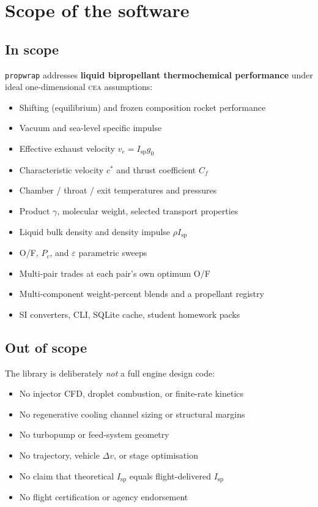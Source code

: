 \documentclass[11pt,a4paper]{report}
\newcommand{\pw}{\texttt{propwrap}}
\newcommand{\cea}{\textsc{cea}}
\newcommand{\Isp}{I_{\mathrm{sp}}}
\newcommand{\cstar}{c^{*}}
\newcommand{\Cf}{C_{f}}
\newcommand{\ve}{v_{e}}
\newcommand{\Pc}{P_{c}}
\newcommand{\eps}{\varepsilon}
\newcommand{\gzero}{g_{0}}
\begin{document}
\chapter{Scope of the software}
\label{ch:scope}

\section{In scope}

\pw{} addresses \textbf{liquid bipropellant thermochemical performance} under
ideal one-dimensional \cea{} assumptions:

\begin{itemize}[leftmargin=*]
  \item Shifting (equilibrium) and frozen composition rocket performance
  \item Vacuum and sea-level specific impulse
  \item Effective exhaust velocity $\ve=\Isp\gzero$
  \item Characteristic velocity $\cstar$ and thrust coefficient $\Cf$
  \item Chamber / throat / exit temperatures and pressures
  \item Product $\gamma$, molecular weight, selected transport properties
  \item Liquid bulk density and density impulse $\rho\Isp$
  \item O/F, $\Pc$, and $\eps$ parametric sweeps
  \item Multi-pair trades at each pair's own optimum O/F
  \item Multi-component weight-percent blends and a propellant registry
  \item SI converters, CLI, SQLite cache, student homework packs
\end{itemize}

\section{Out of scope}

The library is deliberately \emph{not} a full engine design code:

\begin{itemize}[leftmargin=*]
  \item No injector CFD, droplet combustion, or finite-rate kinetics
  \item No regenerative cooling channel sizing or structural margins
  \item No turbopump or feed-system geometry
  \item No trajectory, vehicle $\Delta v$, or stage optimisation
  \item No claim that theoretical $\Isp$ equals flight-delivered $\Isp$
  \item No flight certification or agency endorsement
\end{itemize}
\end{document}
